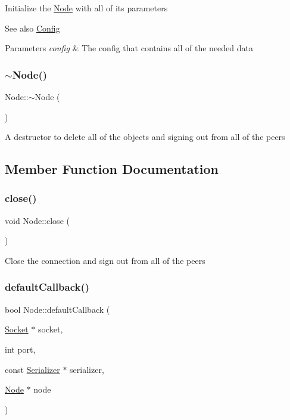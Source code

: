 Initialize the \mbox{\hyperlink{classNode}{Node}} with all of its parameters \begin{DoxySeeAlso}{See also}
\mbox{\hyperlink{classConfig}{Config}}
\end{DoxySeeAlso}

\begin{DoxyParams}{Parameters}
{\em config} & The config that contains all of the needed data \\
\hline
\end{DoxyParams}
\mbox{\label{classNode_aa0840c3cb5c7159be6d992adecd2097c}} 
\subsubsection{\texorpdfstring{$\sim$\+Node()}{~Node()}}
{\footnotesize\ttfamily Node\+::$\sim$\+Node (\begin{DoxyParamCaption}{ }\end{DoxyParamCaption})}

A destructor to delete all of the objects and signing out from all of the peers 

\subsection{Member Function Documentation}
\mbox{\label{classNode_af8cfc7b3fb2f102914daa5fc3b9c52f6}} 
\subsubsection{\texorpdfstring{close()}{close()}}
{\footnotesize\ttfamily void Node\+::close (\begin{DoxyParamCaption}{ }\end{DoxyParamCaption})}

Close the connection and sign out from all of the peers \mbox{\label{classNode_ace919d11ac3ed1853da42eb35602b95b}} 
\subsubsection{\texorpdfstring{default\+Callback()}{defaultCallback()}}
{\footnotesize\ttfamily bool Node\+::default\+Callback (\begin{DoxyParamCaption}\item[{\mbox{\hyperlink{classSocket}{Socket}} $\ast$}]{socket,  }\item[{int}]{port,  }\item[{const \mbox{\hyperlink{classSerializer}{Serializer}} $\ast$}]{serializer,  }\item[{\mbox{\hyperlink{classNode}{Node}} $\ast$}]{node }\end{DoxyParamCaption})\hspace{0.3cm}{\ttfamily [static]}}

